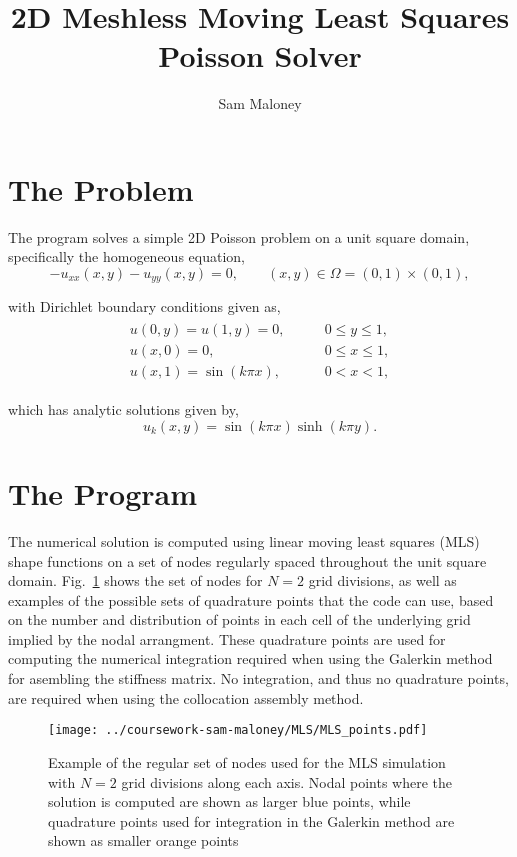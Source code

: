 \documentclass{article}
\begin{document}
\title{2D Meshless Moving Least Squares Poisson Solver}
\author{Sam Maloney}

\maketitle


\section{The Problem}

The program solves a simple 2D Poisson problem on a unit square domain, specifically the homogeneous equation,
\begin{equation}
-u_{xx}(x,y)-u_{yy}(x,y)=0,\qquad(x,y)\in\Omega=(0,1)\times(0,1),
\end{equation}

\noindent
with Dirichlet boundary conditions given as,
\begin{align}
\begin{split}
u(0,y)=u(1,y)=0,&\qquad0\leq y\leq1,\\
u(x,0)=0,&\qquad0\leq x\leq1,\\
u(x,1)=\sin(k\pi x),&\qquad0<x<1,
\end{split}
\end{align}

\noindent
which has analytic solutions given by,
\begin{equation}
u_k(x,y)=\sin(k\pi x)\sinh(k\pi y).
\end{equation}


\section{The Program}

The numerical solution is computed using linear moving least squares (MLS) shape functions on a set of nodes regularly spaced throughout the unit square domain. Fig.~\ref{fig:points} shows the set of nodes for $N=2$ grid divisions, as well as examples of the possible sets of quadrature points that the code can use, based on the number and distribution of points in each cell of the underlying grid implied by the nodal arrangment. These quadrature points are used for computing the numerical integration required when using the Galerkin method for asembling the stiffness matrix. No integration, and thus no quadrature points, are required when using the collocation assembly method.

\begin{figure}
\centering
\texttt{[image: ../coursework-sam-maloney/MLS/MLS\_points.pdf]}
\caption{Example of the regular set of nodes used for the MLS simulation with $N=2$ grid divisions along each axis. Nodal points where the solution is computed are shown as larger blue points, while quadrature points used for integration in the Galerkin method are shown as smaller orange points}
\label{fig:points}
\end{figure}
\end{document}
